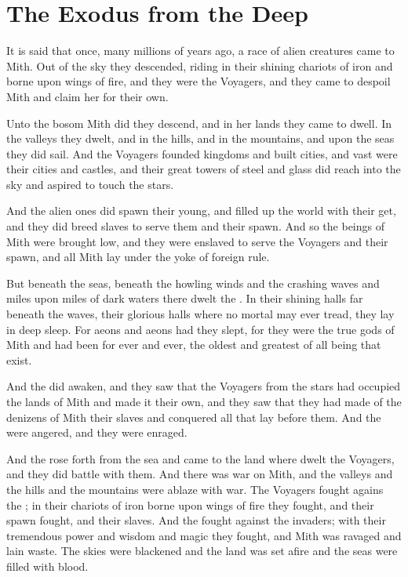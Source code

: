 \section{The Exodus from the Deep}
It is said that once, many millions of years ago, a race of alien creatures came to Mith. Out of the sky they descended, riding in their shining chariots of iron and borne upon wings of fire, and they were the Voyagers, and they came to despoil Mith and claim her for their own. 

Unto the bosom Mith did they descend, and in her lands they came to dwell. In the valleys they dwelt, and in the hills, and in the mountains, and upon the seas they did sail. And the Voyagers founded kingdoms and built cities, and vast were their cities and castles, and their great towers of steel and glass did reach into the sky and aspired to touch the stars. 

And the alien ones did spawn their young, and filled up the world with their get, and they did breed slaves to serve them and their spawn. And so the beings of Mith were brought low, and they were enslaved to serve the Voyagers and their spawn, and all Mith lay under the yoke of foreign rule. 

But beneath the seas, beneath the howling winds and the crashing waves and miles upon miles of dark waters there dwelt the \krakens. In their shining halls far beneath the waves, their glorious halls where no mortal may ever tread, they lay in deep sleep. For aeons and aeons had they slept, for they were the true gods of Mith and had been for ever and ever, the oldest and greatest of all being that exist. 

And the \krakens{} did awaken, and they saw that the Voyagers from the stars had occupied the lands of Mith and made it their own, and they saw that they had made of the denizens of Mith their slaves and conquered all that lay before them. And the \krakens{} were angered, and they were enraged. 

And the \krakens{} rose forth from the sea and came to the land where dwelt the Voyagers, and they did battle with them. And there was war on Mith, and the valleys and the hills and the mountains were ablaze with war. The Voyagers fought agains the \krakens; in their chariots of iron borne upon wings of fire they fought, and their spawn fought, and their slaves. And the \krakens{} fought against the invaders; with their tremendous power and wisdom and magic they fought, and Mith was ravaged and lain waste. 
The skies were blackened and the land was set afire and the seas were filled with blood. 

